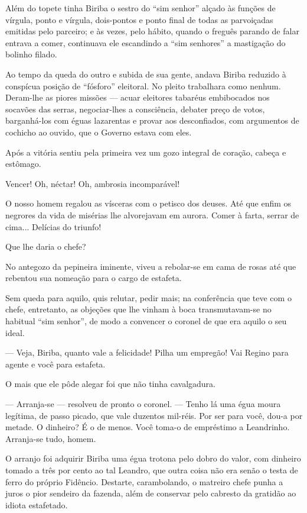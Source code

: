 Além do topete tinha Biriba o sestro do ``sim senhor'' alçado às funções
de vírgula, ponto e vírgula, dois-pontos e ponto final de todas as
parvoiçadas emitidas pelo parceiro; e às vezes, pelo hábito, quando o
freguês parando de falar entrava a comer, continuava ele escandindo a
``sim senhores'' a mastigação do bolinho filado.

Ao tempo da queda do outro e subida de sua gente, andava Biriba reduzido
à conspícua posição de ``fósforo'' eleitoral. No pleito trabalhara como
nenhum. Deram-lhe as piores missões --- acuar eleitores tabaréus
embibocados nos socavões das serras, negociar-lhes a consciência,
debater preço de votos, barganhá-los com éguas lazarentas e provar aos
desconfiados, com argumentos de cochicho ao ouvido, que o Governo estava
com eles.

Após a vitória sentiu pela primeira vez um gozo integral de coração,
cabeça e estômago.

Vencer! Oh, néctar! Oh, ambrosia incomparável!

O nosso homem regalou as vísceras com o petisco dos deuses. Até que
enfim os negrores da vida de misérias lhe alvorejavam em aurora. Comer à
farta, serrar de cima... Delícias do triunfo!

Que lhe daria o chefe?

No antegozo da pepineira iminente, viveu a rebolar-se em cama de rosas
até que rebentou sua nomeação para o cargo de estafeta.

Sem queda para aquilo, quis relutar, pedir mais; na conferência que teve
com o chefe, entretanto, as objeções que lhe vinham à boca
transmutavam-se no habitual ``sim senhor'', de modo a convencer o
coronel de que era aquilo o seu ideal.

--- Veja, Biriba, quanto vale a felicidade! Pilha um empregão! Vai
Regino para agente e você para estafeta.

O mais que ele pôde alegar foi que não tinha cavalgadura.

--- Arranja-se --- resolveu de pronto o coronel. --- Tenho lá uma égua
moura legítima, de passo picado, que vale duzentos mil-réis. Por ser
para você, dou-a por metade. O dinheiro? É o de menos. Você toma-o de
empréstimo a Leandrinho. Arranja-se tudo, homem.

O arranjo foi adquirir Biriba uma égua trotona pelo dobro do valor, com
dinheiro tomado a três por cento ao tal Leandro, que outra coisa não era
senão o testa de ferro do próprio Fidêncio. Destarte, carambolando, o
matreiro chefe punha a juros o pior sendeiro da fazenda, além de
conservar pelo cabresto da gratidão ao idiota estafetado.

